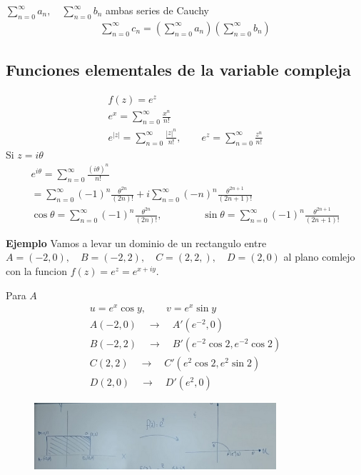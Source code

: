 \documentclass{article}
\newcommand{\caja}[3]{%
  \begin{tcolorbox}[colback=#1!5!white,colframe=#1!25!black,title=#2]
    #3
  \end{tcolorbox}%
}
\begin{document}
\caja{green}{Definicion }{
  $ \sum_{n = 0 }^{\infty}a_n, \quad \sum_{n = 0 }^{\infty}b_n  $ ambas series de Cauchy 
  \begin{gather*}
    \displaystyle\sum_{n = 0 }^{\infty}c_n  = \left(\displaystyle\sum_{n = 0 }^{\infty}a_n \right)\left(\displaystyle\sum_{n = 0 }^{\infty}b_n \right) 
  \end{gather*}
}

\subsection{Funciones elementales de la variable compleja }
\begin{gather*}
  f\left(z\right)=e ^ {z }\\
  e ^ {x } = \displaystyle\sum_{n = 0 }^{\infty} \frac{x ^ {n }}{n! }\\
  e ^ {\left|z \right|} = \displaystyle\sum_{n = 0 }^{\infty} \frac{\left|z \right|^ {n }}{n! }, \qquad e ^ {z } =  \displaystyle\sum_{n = 0 }^{\infty} \frac{z ^ {n }}{n! }
\end{gather*}
Si $ z = i \theta  $
\begin{gather*}
  e ^ {i \theta } = \displaystyle\sum_{n = 0 }^{\infty} \frac{(i\theta )^ {n }}{n! }\\
  = \displaystyle\sum_{n = 0 }^{\infty} (-1 )^ {n }\frac{\theta ^ {2n }}{(2n)! } + i \displaystyle\sum_{n = 0 }^{\infty}(-n )^ {n }\frac{\theta ^ {2n + 1 }}{(2n+1)! }\\
  \cos{\theta} = \displaystyle\sum_{n = 0 }^{\infty}(-1)^ {n } \frac{\theta ^ {2n }}{(2n)! }, \qquad \qquad \sin{\theta} = \displaystyle\sum_{n = 0 }^{\infty}(-1)^ {n }\frac{\theta ^ {2n + 1 }}{(2n + 1)!}
\end{gather*}

\textbf{Ejemplo } Vamos a levar un dominio de un rectangulo entre $ A = (-2,0 ),\quad B = (-2,2),\quad C = (2,2,),\quad D = (2,0) $ al plano comlejo con la funcion $ f\left(z\right)=e ^ {z } = e ^ {x + i y } $. 

Para $ A  $
\begin{gather*}
  u = e ^ {x }\cos{y }, \qquad v = e ^ {x }\sin{y }\\
  A(-2,0) \quad \rightarrow \quad A'(e ^ {-2 }, 0 ) \\
  B(-2,2) \quad \rightarrow \quad B' (e ^ {-2 }\cos{2 }, e ^ {-2 }\cos{2 })\\
  C(2,2) \quad \rightarrow \quad C'(e ^ {2 }\cos{2 }, e ^ {2 }\sin{2 })\\
  D(2,0 ) \quad \rightarrow \quad D'(e ^ {2 }, 0)
\end{gather*}
\begin{figure}[H]
  \begin{center}
    \includegraphics[width=0.8\textwidth]{transformacion_dominio_ej1.png}
  \end{center}
\end{figure}
\end{document}
